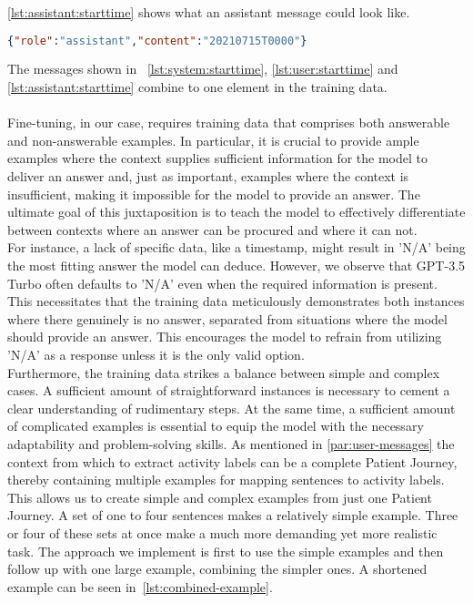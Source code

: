 \autoref{lst:assistant:starttime} shows what an assistant message could look like.
\begin{lstlisting}[language=json, caption={Assistant message for determining an activities start timestamp}, label={lst:assistant:starttime}, float=ht]
{"role":"assistant","content":"20210715T0000"}
\end{lstlisting}

The messages shown in ~\autoref{lst:system:starttime}, \ref{lst:user:starttime} and \ref{lst:assistant:starttime} combine to one element in the training data.\\\\

Fine-tuning, in our case, requires training data that comprises both answerable and non-answerable examples. In particular, it is crucial to provide ample examples where the context supplies sufficient information for the model to deliver an answer and, just as important, examples where the context is insufficient, making it impossible for the model to provide an answer. The ultimate goal of this juxtaposition is to teach the model to effectively differentiate between contexts where an answer can be procured and where it can not.\\
For instance, a lack of specific data, like a timestamp, might result in 'N/A' being the most fitting answer the model can deduce. However, we observe that GPT-3.5 Turbo often defaults to 'N/A' even when the required information is present. This necessitates that the training data meticulously demonstrates both instances where there genuinely is no answer, separated from situations where the model should provide an answer. This encourages the model to refrain from utilizing 'N/A' as a response unless it is the only valid option.\\
Furthermore, the training data strikes a balance between simple and complex cases. A sufficient amount of straightforward instances is necessary to cement a clear understanding of rudimentary steps. At the same time, a sufficient amount of complicated examples is essential to equip the model with the necessary adaptability and problem-solving skills. As mentioned in \ref{par:user-messages} the context from which to extract activity labels can be a complete Patient Journey, thereby containing multiple examples for mapping sentences to activity labels. This allows us to create simple and complex examples from just one Patient Journey. A set of one to four sentences makes a relatively simple example. Three or four of these sets at once make a much more demanding yet more realistic task. The approach we implement is first to use the simple examples and then follow up with one large example, combining the simpler ones. A shortened example can be seen in~\autoref{lst:combined-example}.
